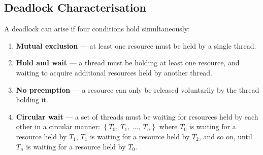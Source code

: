 \documentclass{article}
\begin{document}
\subsection{Deadlock Characterisation}
A deadlock can arise if four conditions hold simultaneously:
\begin{enumerate}
    \item \textbf{Mutual exclusion} --- at least one resource must be
          held by a single thread.
    \item \textbf{Hold and wait} --- a thread must be holding at least
          one resource, and waiting to acquire additional resources held
          by another thread.
    \item \textbf{No preemption} --- a resource can only be released
          voluntarily by the thread holding it.
    \item \textbf{Circular wait} --- a set of threads must be waiting
          for resources held by each other in a circular manner:
          \(\left\{ T_0,\: T_1,\: \ldots,\: T_n \right\}\) where
          \(T_0\) is waiting for a resource held by \(T_1\), \(T_1\) is
          waiting for a resource held by \(T_2\), and so on, until
          \(T_n\) is waiting for a resource held by \(T_0\).
\end{enumerate}
\end{document}
